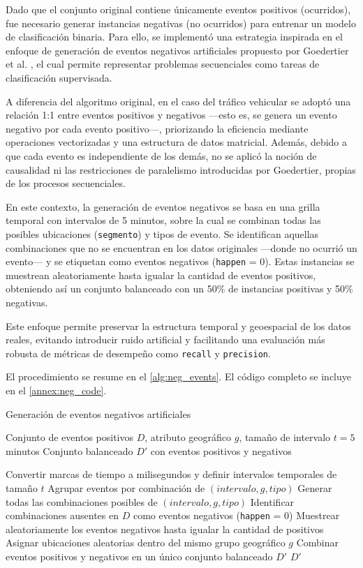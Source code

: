 \documentclass[12pt]{article}
\begin{document}
Dado que el conjunto original contiene únicamente eventos positivos (ocurridos), fue necesario generar instancias negativas (no ocurridos) para entrenar un modelo de clasificación binaria. Para ello, se implementó una estrategia inspirada en el enfoque de generación de eventos negativos artificiales propuesto por Goedertier et al. \parencite{goedertier2009robust}, el cual permite representar problemas secuenciales como tareas de clasificación supervisada.

A diferencia del algoritmo original, en el caso del tráfico vehicular se adoptó una relación 1:1 entre eventos positivos y negativos —esto es, se genera un evento negativo por cada evento positivo—, priorizando la eficiencia mediante operaciones vectorizadas y una estructura de datos matricial. Además, debido a que cada evento es independiente de los demás, no se aplicó la noción de causalidad ni las restricciones de paralelismo introducidas por Goedertier, propias de los procesos secuenciales.

En este contexto, la generación de eventos negativos se basa en una grilla temporal con intervalos de 5 minutos, sobre la cual se combinan todas las posibles ubicaciones (\texttt{segmento}) y tipos de evento. Se identifican aquellas combinaciones que no se encuentran en los datos originales —donde no ocurrió un evento— y se etiquetan como eventos negativos (\texttt{happen} = 0). Estas instancias se muestrean aleatoriamente hasta igualar la cantidad de eventos positivos, obteniendo así un conjunto balanceado con un 50\% de instancias positivas y 50\% negativas.

Este enfoque permite preservar la estructura temporal y geoespacial de los datos reales, evitando introducir ruido artificial y facilitando una evaluación más robusta de métricas de desempeño como \texttt{recall} y \texttt{precision}.

El procedimiento se resume en el \autoref{alg:neg_events}. El código completo se incluye en el \autoref{annex:neg_code}.

\begin{algorithm}[H]
\caption{Generación de eventos negativos artificiales}
\label{alg:neg_events}
\begin{algorithmic}[1]
\Require Conjunto de eventos positivos $D$, atributo geográfico $g$, tamaño de intervalo $t = 5$ minutos
\Ensure Conjunto balanceado $D'$ con eventos positivos y negativos

\State Convertir marcas de tiempo a milisegundos y definir intervalos temporales de tamaño $t$
\State Agrupar eventos por combinación de $(intervalo, g, tipo)$
\State Generar todas las combinaciones posibles de $(intervalo, g, tipo)$
\State Identificar combinaciones ausentes en $D$ como eventos negativos (\texttt{happen} = 0)
\State Muestrear aleatoriamente los eventos negativos hasta igualar la cantidad de positivos
\State Asignar ubicaciones aleatorias dentro del mismo grupo geográfico $g$
\State Combinar eventos positivos y negativos en un único conjunto balanceado $D'$
\State \Return $D'$
\end{algorithmic}
\end{algorithm}
\end{document}
